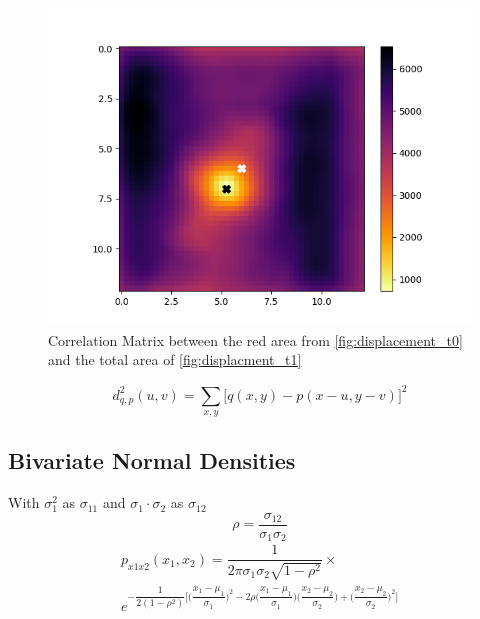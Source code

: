 \documentclass[11pt,twoside,a4paper,fleqn]{report}
\numberwithin{equation}{chapter}
\numberwithin{figure}{chapter}
\numberwithin{table}{chapter}
\begin{document}
\begin{figure}[ht]
	\includegraphics[width=\textwidth,trim={15mm 0 15mm 0},clip]{Correlation_Matrix.png}
	\caption{Correlation Matrix between the red area from \ref{fig:displacement_t0} and the total area of \ref{fig:displacment_t1}}
	\label{fig:corr_matrix}
\end{figure}
\begin{equation}
	d^2_{q,p}(u,v) = \sum_{x,y}^{}\big[q(x,y)-p(x-u,y-v)\big]^2
\end{equation}
\subsection{Bivariate Normal Densities}
With $\sigma_1^2$ as $\sigma_{11}$ and $\sigma_1 \cdot\sigma_2$ as $\sigma_{12}$
\begin{equation}
	\rho = \dfrac{\sigma_{12}}{\sigma_1\sigma_2}
\end{equation}
\begin{equation}
	\begin{multlined}
		p_{x1x2}(x_1,x_2)=\dfrac{1}{2\pi\sigma_1\sigma_2\sqrt{1-\rho^2}} \times \\ e^{-\dfrac{1}{2(1-\rho^2)}\bigg[\bigg(\dfrac{x_1-\mu_1}{\sigma_1}\bigg)^2-2\rho\bigg(\dfrac{x_1-\mu_1}{\sigma_1}\bigg)\bigg(\dfrac{x_2-\mu_2}{\sigma_2}\bigg)+\bigg(\dfrac{x_2-\mu_2}{\sigma_2}\bigg)^2\bigg]}
	\end{multlined}
\end{equation}
\end{document}
